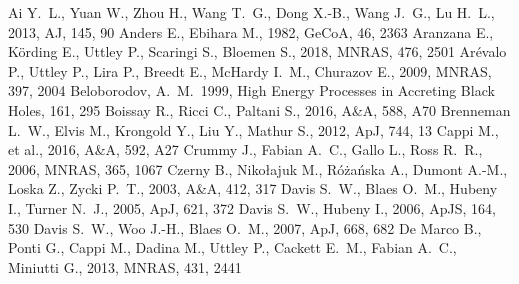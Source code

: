 \documentclass[a4paper,fleqn,usenatbib]{mnras}
\begin{document}
\begin{thebibliography}{99}
 Ai Y.~L., Yuan W., Zhou H., Wang T.~G., Dong X.-B., Wang J.~G., Lu H.~L., 2013, AJ, 145, 90 
 Anders E., Ebihara M., 1982, GeCoA, 46, 2363 
 Aranzana E., K{\"o}rding E., Uttley P., Scaringi S., Bloemen S., 2018, MNRAS, 476, 2501 
 Ar{\'e}valo P., Uttley P., Lira P., Breedt E., McHardy I.~M., Churazov E., 2009, MNRAS, 397, 2004 
 Beloborodov, A.~M.\ 1999, High Energy Processes in Accreting Black Holes, 161, 295 
 Boissay R., Ricci C., Paltani S., 2016, A\&A, 588, A70 
 Brenneman L.~W., Elvis M., Krongold Y., Liu Y., Mathur S., 2012, ApJ, 744, 13 
 Cappi M., et al., 2016, A\&A, 592, A27 
 Crummy J., Fabian A.~C., Gallo L., Ross R.~R., 2006, MNRAS, 365, 1067 
 Czerny B., Niko{\l}ajuk M., R{\'o}{\.z}a{\'n}ska A., Dumont A.-M., Loska Z., Zycki P.~T., 2003, A\&A, 412, 317 
 Davis S.~W., Blaes O.~M., Hubeny I., Turner N.~J., 2005, ApJ, 621, 372 
 Davis S.~W., Hubeny I., 2006, ApJS, 164, 530 
 Davis S.~W., Woo J.-H., Blaes O.~M., 2007, ApJ, 668, 682 
 De Marco B., Ponti G., Cappi M., Dadina M., Uttley P., Cackett E.~M., Fabian A.~C., Miniutti G., 2013, MNRAS, 431, 2441%

\end{thebibliography}
\end{document}
